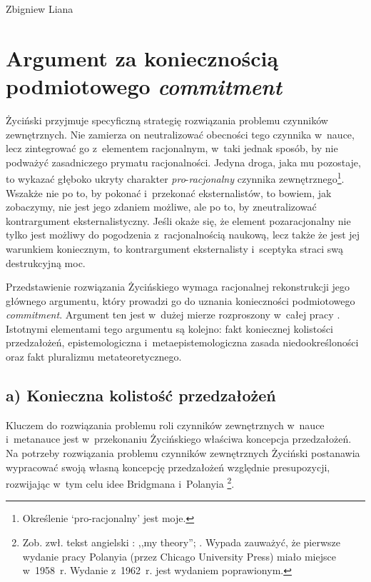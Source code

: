 \begin{artplenv}{Zbigniew Liana}
\section{Argument za koniecznością podmiotowego \textit{commitment}}
Życiński przyjmuje specyficzną strategię rozwiązania problemu czynników zewnętrznych. Nie zamierza on neutralizować obecności tego czynnika w~nauce, lecz zintegrować go z~elementem racjonalnym, w~taki jednak sposób, by nie podważyć zasadniczego prymatu racjonalności. Jedyna droga, jaka mu pozostaje, to wykazać głęboko ukryty charakter \textit{pro}-\textit{racjonalny} czynnika zewnętrznego\footnote{Określenie ‘pro-racjonalny' jest moje.}. Wszakże nie po to, by pokonać i~przekonać eksternalistów, to bowiem, jak zobaczymy, nie jest jego zdaniem możliwe, ale po to, by zneutralizować kontrargument eksternalistyczny. Jeśli okaże się, że element pozaracjonalny nie tylko jest możliwy do pogodzenia z~racjonalnością naukową, lecz także że jest jej warunkiem koniecznym, to kontrargument eksternalisty i~sceptyka straci swą destrukcyjną moc.

Przedstawienie rozwiązania Życińskiego wymaga racjonalnej rekonstrukcji jego głównego argumentu, który prowadzi go do uznania konieczności podmiotowego \textit{commitment}. Argument ten jest w~dużej mierze rozproszony w~całej pracy
\parencite[][]{zycinski_teizm_1985}. %
 Istotnymi elementami tego argumentu są kolejno: fakt koniecznej kolistości przedzałożeń, epistemologiczna i~metaepistemologiczna zasada niedookreśloności oraz fakt pluralizmu metateoretycznego.

\subsection{a) Konieczna kolistość przedzałożeń}

Kluczem do rozwiązania problemu roli czynników zewnętrznych w~nauce i~metanauce jest w~przekonaniu Życińskiego
\parencite*[][s.~7]{zycinski_teizm_1985} %
 właściwa koncepcja przedzałożeń. Na potrzeby rozwiązania problemu czynników zewnętrznych Życiński postanawia wypracować swoją własną koncepcję przedzałożeń względnie presupozycji, rozwijając w~tym celu idee Bridgmana 
\parencite*[][]{bridgman_reflections_1950} %
 i~Polanyia 
\parencite*[][]{polanyi_personal_1962}%
\footnote{Zob. zwł. tekst angielski 
\parencite[][s.~202]{zycinski_structure_1988}: %
 ,,my theory''; 
\parencites[por.][s.~351]{zycinski_struktura_2013_liana}[zob. także][s.~145]{zycinski_structure_1988}[][s.~256]{zycinski_struktura_2013_liana}[][s.~187 przypis 283]{zycinski_elementy_1996}[][s.~254 przypis 18]{zycinski_elementy_2015}. %
 Wypada zauważyć, że pierwsze wydanie pracy Polanyia (przez Chicago University Press) miało miejsce w~1958~r. Wydanie z~1962~r. jest wydaniem poprawionym.}.


\end{artplenv}
